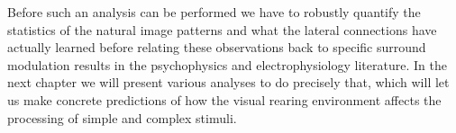 Before such an analysis can be performed we have to robustly quantify
the statistics of the natural image patterns and what the lateral
connections have actually learned before relating these observations
back to specific surround modulation results in the psychophysics and
electrophysiology literature. In the next chapter we will present
various analyses to do precisely that, which will let us make concrete
predictions of how the visual rearing environment affects the
processing of simple and complex stimuli.

